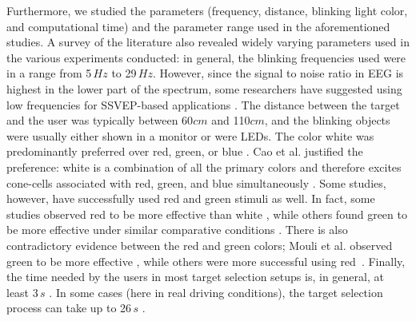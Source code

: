 \documentclass[smallextended]{svjour3}
\begin{document}
Furthermore, we studied the parameters (frequency, distance, blinking light color, and computational time) and the parameter range used in the aforementioned studies.
A survey of the literature also revealed widely varying parameters used in the various experiments conducted:
in general, the blinking frequencies used were in a range from 5\,$Hz$ to 29\,$Hz$.
However, since the signal to noise ratio in EEG is highest in the lower part of the spectrum, some researchers have suggested using low frequencies for SSVEP-based applications \cite{paper6}.
The distance between the target and the user was typically between 60$cm$ and 110$cm$, and the blinking objects were usually either shown in a monitor or were LEDs.
The color white was predominantly preferred over red, green, or blue \cite{paper6,aljshamee2014beyond,aljshamee2016discriminate,cao2012flashing,paper2}. Cao et al. justified the preference: white is a combination of all the primary colors and therefore excites cone-cells associated with red, green, and blue simultaneously \cite{cao2012flashing}. 
Some studies, however, have successfully used red \cite{paper_5,jian2014improving,paper4} and green \cite{chua2004effects,duvinage2013performance,SSVEPfiability,hvaring2014comparison,paper4,mouli2013performance} stimuli as well.
In fact, some studies observed red to be more effective than white \cite{paper_5,hvaring2014comparison}, while others found green to be more effective under similar comparative conditions \cite{chua2004effects,duvinage2013performance}. 
There is also contradictory evidence between the red and green colors; Mouli et al. observed green to be more effective \cite{mouli2013performance}, while others were more successful using red~\cite{cao2012flashing}.
Finally, the time needed by the users in most target selection setups is, in general, at least 3\,$s$ \cite{car,SSVEPfiability,jian2014improving,paper4}.
In some cases (here in real driving conditions), the target selection process can take up to 26\,$s$ \cite{car}.
\end{document}

